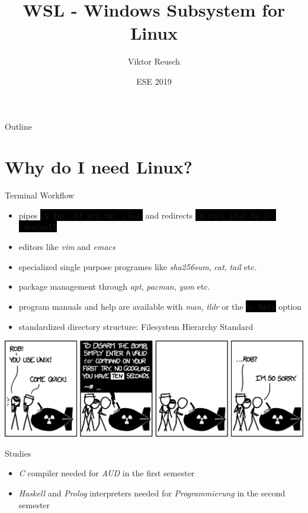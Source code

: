 \documentclass[10pt,graphics,aspectratio=169,table]{beamer}
\title{WSL - Windows Subsystem for Linux}
\author{Viktor Reusch}
\date{ESE 2019}
\institute{NERD101 - ESE - ifsr - TU Dresden}
\newcommand{\code}[0]{\lstinline[basicstyle=\ttfamily\color{white}]}
\newcommand{\cbox}[1]{\colorbox{black}{#1}}
\begin{document}
\maketitle

\begin{frame}{Outline}
    \tableofcontents
\end{frame}

\section{Why do I need Linux?}
\begin{frame}{Terminal Workflow}
\begin{itemize}
    \item pipes \cbox{\code|\$ tar -tf src.tar \| less|} and redirects \cbox{\code|\$ curl ifsr.de 2> /dev/null|}
    \item editors like \textit{vim} and \textit{emacs}
    \item specialized single purpose programes like \textit{sha256sum}, \textit{cat}, \textit{tail} etc.
    \item package management through \textit{apt}, \textit{pacman}, \textit{yum} etc.
    \item program manuals and help are available with \textit{man}, \textit{tldr} or the \cbox{\code|\--help|} option
    \item standardized directory structure: Filesystem Hierarchy Standard
\end{itemize}
\centering
\includegraphics[width=\textwidth]{img/tar.png} \cite{tar}
\end{frame}

\begin{frame}{Studies}
\begin{itemize}
    \item \textit{C} compiler needed for \textit{AUD} in the first semester
    \item \textit{Haskell} and \textit{Prolog} interpreters needed for \textit{Programmierung} in the second semester
\end{itemize}
\end{frame}
\end{document}

